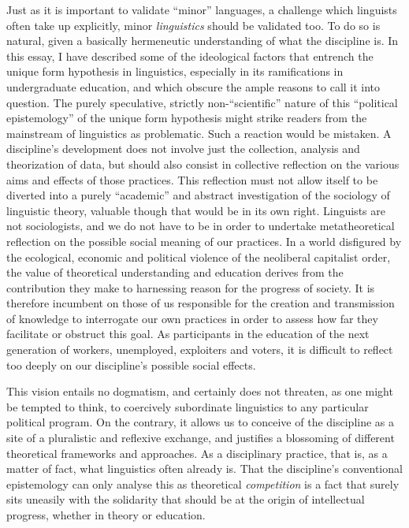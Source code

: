 \documentclass[output=paper]{langscibook}
\begin{document}
Just as it is important to validate ``minor'' languages, a challenge which linguists often take up explicitly, minor \emph{linguistics} should be validated too. To do so is natural, given a basically hermeneutic understanding of what the discipline is. In this essay, I have described some of the ideological factors that entrench the unique form hypothesis in linguistics, especially in its ramifications in undergraduate education, and which obscure the ample reasons to call it into question. The purely speculative, strictly non-``scientific'' nature of this ``political epistemology'' of the unique form hypothesis might strike readers from the mainstream of linguistics as problematic. Such a reaction would be mistaken. A discipline's development does not involve just the collection, analysis and theorization of data, but should also consist in collective reflection on the various aims and effects of those practices. This reflection must not allow itself to be diverted into a purely ``academic'' and abstract investigation of the sociology of linguistic theory, valuable though that would be in its own right. Linguists are not sociologists, and we do not have to be in order to undertake metatheoretical reflection on the possible social meaning of our practices. In a world disfigured by the ecological, economic and political violence of the neoliberal capitalist order, the value of theoretical understanding and education derives from the contribution they make to harnessing reason for the progress of society. It is therefore incumbent on those of us responsible for the creation and transmission of knowledge to interrogate our own practices in order to assess how far they facilitate or obstruct this goal. As participants in the education of the next generation of workers, unemployed, exploiters and voters, it is difficult to reflect too deeply on our discipline's possible social effects.

This vision entails no dogmatism, and certainly does not threaten, as one might be tempted to think, to coercively subordinate linguistics to any particular political program. On the contrary, it allows us to conceive of the discipline as a site of a pluralistic and reflexive exchange, and justifies a blossoming of different theoretical frameworks and approaches. As a disciplinary practice, that is, as a matter of fact, what linguistics often already is. That the discipline's conventional epistemology can only analyse this as theoretical \emph{competition} is a fact that surely sits uneasily with the solidarity that should be at the origin of intellectual progress, whether in theory or education.

\sloppy
\printbibliography[heading=subbibliography,notkeyword=this] 
\end{document}
